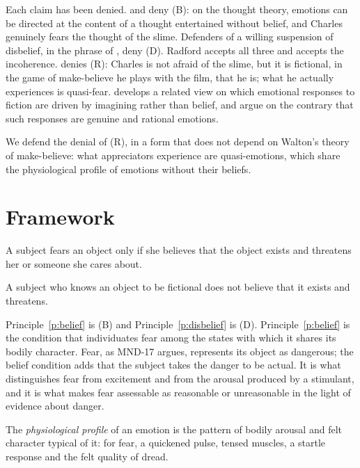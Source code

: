 \documentclass{situationist-preprint}
\begin{document}
Each claim has been denied. \citet{Lamarque1981} and \citet{Carroll1990} deny (B): on the thought theory, emotions can be directed at the content of a thought entertained without belief, and Charles genuinely fears the thought of the slime. Defenders of a willing suspension of disbelief, in the phrase of \citet[ch.~XIV]{Coleridge1817}, deny (D). Radford accepts all three and accepts the incoherence. \citet{Walton1978,Walton1990} denies (R): Charles is not afraid of the slime, but it is fictional, in the game of make-believe he plays with the film, that he is; what he actually experiences is quasi-fear. \citet{Currie1990} develops a related view on which emotional responses to fiction are driven by imagining rather than belief, and \citet{GendlerKovakovich2006} argue on the contrary that such responses are genuine and rational emotions.

We defend the denial of (R), in a form that does not depend on Walton's theory of make-believe: what appreciators experience are quasi-emotions, which share the physiological profile of emotions without their beliefs.

\section{Framework}

\begin{principle}\label{p:belief}
A subject fears an object only if she believes that the object exists and threatens her or someone she cares about.
\end{principle}

\begin{principle}[Disbelief]\label{p:disbelief}
A subject who knows an object to be fictional does not believe that it exists and threatens.
\end{principle}

Principle~\ref{p:belief} is (B) and Principle~\ref{p:disbelief} is (D). Principle~\ref{p:belief} is the condition that individuates fear among the states with which it shares its bodily character. Fear, as MND-17 argues, represents its object as dangerous; the belief condition adds that the subject takes the danger to be actual. It is what distinguishes fear from excitement and from the arousal produced by a stimulant, and it is what makes fear assessable as reasonable or unreasonable in the light of evidence about danger.

\begin{definition}\label{d:profile}
The \emph{physiological profile} of an emotion is the pattern of bodily arousal and felt character typical of it: for fear, a quickened pulse, tensed muscles, a startle response and the felt quality of dread.
\end{definition}
\end{document}

